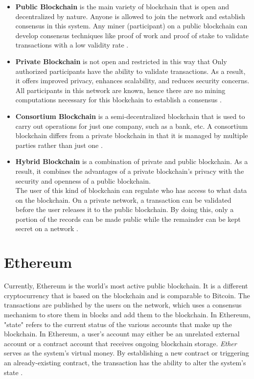 \begin{itemize}
    \item \textbf{Public Blockchain} is the main variety of blockchain that is open and decentralized by nature. Anyone is allowed to join the network and establish consensus in this system. Any miner (participant) on a public blockchain can develop consensus techniques like proof of work and proof of stake to validate transactions with a low validity rate \cite{Kalra}.
    \item \textbf{Private Blockchain} is not open and restricted in this way that Only authorized participants have the ability to validate transactions. As a result, it offers improved privacy, enhances scalability, and reduces security concerns. All participants in this network are known, hence there are no mining computations necessary for this blockchain to establish a consensus \cite{Kalra}. 
    \item \textbf{Consortium Blockchain} is a semi-decentralized blockchain that is used to carry out operations for just one company, such as a bank, etc. A consortium blockchain differs from a private blockchain in that it is managed by multiple parties rather than just one \cite{Aithal}.
    \item \textbf{Hybrid Blockchain} is a combination of private and public blockchain. As a result, it combines the advantages of a private blockchain's privacy with the security and openness of a public blockchain. \\
    The user of this kind of blockchain can regulate who has access to what data on the blockchain. On a private network, a transaction can be validated before the user releases it to the public blockchain. By doing this, only a portion of the records can be made public while the remainder can be kept secret on a network \cite{Aithal}.
\end{itemize}

\section{Ethereum}
Currently, Ethereum is the world's most active public blockchain. It is a different cryptocurrency that is based on the blockchain and is comparable to Bitcoin. The transactions are published by the users on the network, which uses a consensus mechanism to store them in blocks and add them to the blockchain. In Ethereum, "state" refers to the current status of the various accounts that make up the blockchain. In Ethereum, a user's account may either be an unrelated external account or a contract account that receives ongoing blockchain storage. \textit{Ether} serves as the system's virtual money. By establishing a new contract or triggering an already-existing contract, the transaction has the ability to alter the system's state \cite{Ilya}.
